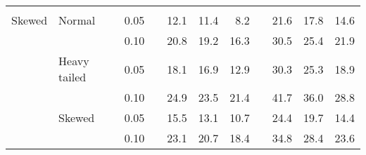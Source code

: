 \begin{table}[ht]
\begin{scriptsize}
\begin{center}
\begin{tabular}{ll p{.1cm} c p{.1cm} rrr p{.1cm} rrr}
&&&&&&&&&&&\\
Skewed       & Normal       && 0.05 &&   12.1 & 11.4 & 8.2 &   & 21.6 & 17.8 & 14.6 \\ 
             &              && 0.10 &&   20.8 & 19.2 & 16.3 &   & 30.5 & 25.4 & 21.9 \\ 
             & Heavy tailed && 0.05 &&   18.1 & 16.9 & 12.9 &   & 30.3 & 25.3 & 18.9 \\ 
             &              && 0.10 &&   24.9 & 23.5 & 21.4 &   & 41.7 & 36.0 & 28.8 \\ 
             & Skewed       && 0.05 &&   15.5 & 13.1 & 10.7 &   & 24.4 & 19.7 & 14.4 \\ 
             &              && 0.10 &&   23.1 & 20.7 & 18.4 &   & 34.8 & 28.4 & 23.6 \\ 


\end{tabular}
\end{center}
\end{scriptsize}
\end{table}
